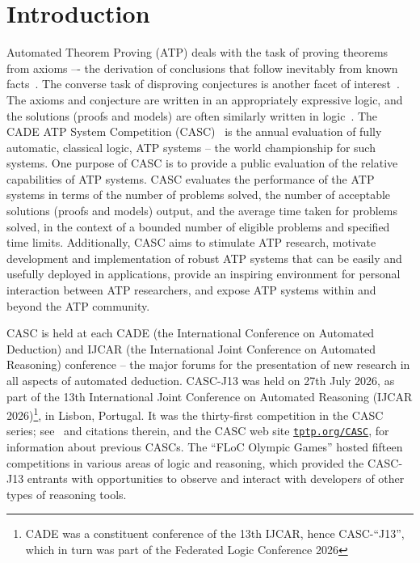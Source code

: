 \documentclass[aic]{iosart2x}
\newcommand{\smalltt}[1]{\small \texttt{#1}}
\newcommand{\THIS}{\mbox{CASC-J13}}
\newcommand{\NTHCOMPETITION}{\mbox{thirty-first}}
\begin{document}
\section{Introduction}
\label{Introduction}

Automated Theorem Proving (ATP) deals with the task of proving theorems from axioms –- the
derivation of conclusions that follow inevitably from known facts~\cite{RV01-HAR}.
The converse task of disproving conjectures is another facet of interest~\cite{CS03,BN10-ITP}.
The axioms and conjecture are written in an appropriately expressive logic, and the solutions
(proofs and models) are often similarly written in logic~\cite{Sut23-IGPL}.
The CADE ATP System Competition (CASC)~\cite{Sut16} is the annual evaluation of fully automatic,
classical logic, ATP systems – the world championship for such systems.
One purpose of CASC is to provide a public evaluation of the relative capabilities of ATP systems.
CASC evaluates the performance of the ATP systems in terms of
the number of problems solved,
the number of acceptable solutions (proofs and models) output, and
the average time taken for problems solved,
in the context of
a bounded number of eligible problems and
specified time limits.
Additionally, CASC aims to
stimulate ATP research,
motivate development and implementation of robust ATP systems that can be easily and usefully
deployed in applications,
provide an inspiring environment for personal interaction between ATP researchers,
and
expose ATP systems within and beyond the ATP community.

CASC is held at each CADE (the International Conference on Automated Deduction) and IJCAR
(the International Joint Conference on Automated Reasoning) conference -- the major forums
for the presentation of new research in all aspects of automated deduction.
\THIS{} was held on 27th July 2026, as part of the
13th International Joint Conference on Automated Reasoning (IJCAR 2026)\footnote{%
CADE was a constituent conference of the 13th IJCAR, hence CASC-``J13'',
which in turn was part of the Federated Logic Conference 2026},
in Lisbon, Portugal.
It was the \NTHCOMPETITION{} competition in the CASC series; see~\cite{Sut26-CASC} and citations
therein, and the CASC web site \href{http://tptp.org/CASC}{\smalltt{tptp.org/CASC}}, for 
information about previous CASCs.
The ``FLoC Olympic Games'' hosted fifteen competitions in various areas of logic and reasoning, 
which provided the \THIS{} entrants with opportunities to observe and interact with developers 
of other types of reasoning tools.
\end{document}
